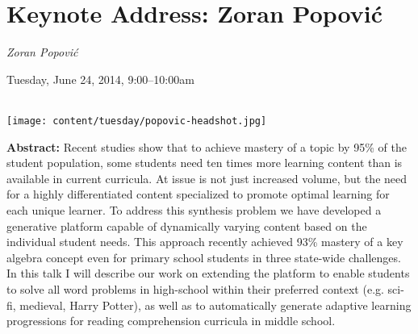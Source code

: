 \section{Keynote Address: Zoran Popović}
\begin{center}

\begin{Large}
{\bfseries\Large ``Text Generation for Infinitely Adaptable Curricula''}}\vspace{1em}\par
\end{Large}

{\itshape Zoran Popović}\vspace{1em}\par
Tuesday, June 24, 2014, 9:00--10:00am \vspace{1em}\\
\PlenaryLoc \\
\vspace{1em}\par
\texttt{[image: content/tuesday/popovic-headshot.jpg]}
\end{center}

\noindent
{\bfseries Abstract:} Recent studies show that to achieve mastery of a
topic by 95\% of the student population, some students need ten times
more learning content than is available in current curricula.  At
issue is not just increased volume, but the need for a highly
differentiated content specialized to promote optimal learning for
each unique learner.  To address this synthesis problem we have
developed a generative platform capable of dynamically varying content
based on the individual student needs.  This approach recently
achieved 93\% mastery of a key algebra concept even for primary school
students in three state-wide challenges.  In this talk I will describe
our work on extending the platform to enable students to solve all
word problems in high-school within their preferred context
(e.g. sci-fi, medieval, Harry Potter), as well as to automatically
generate adaptive learning progressions for reading comprehension
curricula in middle school.

\vspace{3em}\par 

\vfill
\noindent

